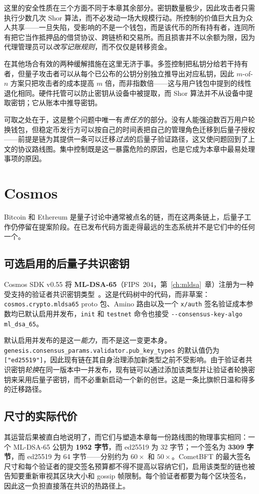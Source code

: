 这里的安全性质在三个方面不同于本章其余部分。密钥数量极少，因此攻击者只需执行少数几次 Shor 算法，而不必发动一场大规模行动。所控制的价值巨大且为众人共享——一旦失陷，受影响的不是一个钱包，而是该代币的所有持有者，连同所有把它当作抵押品的借贷协议、跨链桥和交易所。而且损害并不以余额为限，因为代理管理员可以\emph{改写记账规则}，而不仅仅是转移资金。

在其他场合有效的两种缓解措施在这里无济于事。多签控制把私钥分给若干持有者，但量子攻击者可以从每个已公布的公钥分别独立推导出对应私钥，因此 $m$-of-$n$ 方案只把攻击者的成本提高 $m$ 倍，而非指数倍——这与用户钱包中提到的线性退化相同。硬件托管可以防止密钥从设备中被提取，而 Shor 算法并不从设备中提取密钥；它从账本中推导密钥。

可取之处在于，这是整个问题中唯一有\emph{责任方}的部分。没有人能强迫数百万用户轮换钱包，但稳定币发行方可以按自己的时间表把自己的管理角色迁移到后量子授权——前提是链为其提供一条可以迁移\emph{过去}的后量子验证路径，这又使问题回到了上文的协议路线图。集中控制既是这一暴露危险的原因，也是它成为本章中最易处理事项的原因。

\section{Cosmos}

Bitcoin 和 Ethereum 是量子讨论中通常被点名的链，而在这两条链上，后量子工作仍停留在提案阶段。在已发布代码方面走得最远的生态系统并不是它们中的任何一个。

\subsection{可选启用的后量子共识密钥}
Cosmos SDK v0.55 将 \textbf{ML-DSA-65}（FIPS~204，第~\ref{ch:mldsa}~章）注册为一种受支持的验证者共识密钥类型~\cite{cosmossdkpq,cosmospqdocs}。这是代码树中的代码，而非草案：\texttt{cosmos.crypto.mldsa65} proto 包、Amino 路由以及一个 \texttt{x/auth} 签名验证成本参数均已默认启用并发布，\texttt{init} 和 \texttt{testnet} 命令也接受 \texttt{-{}-consensus-key-algo ml\_dsa\_65}。

默认启用并发布的是这一\emph{能力}，而不是这一变更本身。\texttt{genesis.consensus\_params.validator.pub\_key\_types} 的默认值仍为 \texttt{["ed25519"]}，因此现有链在其自身治理添加新类型之前不受影响。由于验证者共识密钥\emph{轮换}在同一版本中一并发布，现有链可以通过添加该类型并让验证者轮换密钥来采用后量子密钥，而不必重新启动一个新的创世。这是一条比旗帜日温和得多的迁移路径。

\subsection{尺寸的实际代价}
其运营后果被直白地说明了，而它们与塑造本章每一份路线图的物理事实相同：一个 ML-DSA-65 公钥为 \textbf{1952 字节}，而 ed25519 为 32 字节；一个签名为 \textbf{3309 字节}，而 ed25519 为 64 字节——分别约为 $60\times$ 和 $50\times$。CometBFT 的最大签名尺寸和每个验证者的提交签名预算都不得不提高以容纳它们，启用该类型的链也被告知要重新审视其区块大小和 gossip 帧限制。每个验证者都要为每个区块签名，因此这一负担直接落在共识的热路径上。

